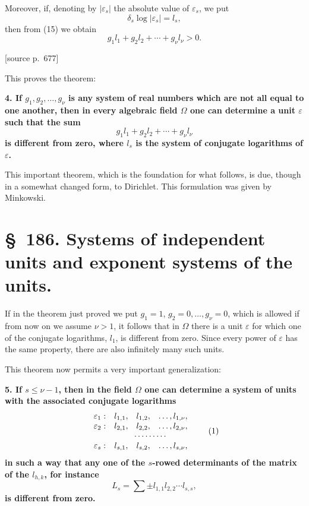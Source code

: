 \documentclass[11pt]{article}
\newcommand{\srcpage}[1]{\par\medskip\noindent\textsf{[source p.~#1]}\par\smallskip}
\begin{document}
Moreover, if, denoting by $|\varepsilon_s|$ the absolute value of $\varepsilon_s$, we put
\begin{equation}
\delta_s\log|\varepsilon_s|=l_s,
\tag{16}
\end{equation}
then from (15) we obtain
\begin{equation}
g_1l_1+g_2l_2+\cdots+g_\nu l_\nu>0.
\tag{17}
\end{equation}

\srcpage{677}
This proves the theorem:

\textbf{4. If $g_1,g_2,\ldots,g_\nu$ is any system of real numbers which are not all equal to one another, then in every algebraic field $\Omega$ one can determine a unit $\varepsilon$ such that the sum}
\[
g_1l_1+g_2l_2+\cdots+g_\nu l_\nu
\]
\textbf{is different from zero, where $l_s$ is the system of conjugate logarithms of $\varepsilon$.}

This important theorem, which is the foundation for what follows, is due, though in a somewhat changed form, to Dirichlet. This formulation was given by Minkowski.

\section*{\S~186. Systems of independent units and exponent systems of the units.}

If in the theorem just proved we put $g_1=1$, $g_2=0,\ldots,g_\nu=0$, which is allowed if from now on we assume $\nu>1$, it follows that in $\Omega$ there is a unit $\varepsilon$ for which one of the conjugate logarithms, $l_1$, is different from zero. Since every power of $\varepsilon$ has the same property, there are also infinitely many such units.

This theorem now permits a very important generalization:

\textbf{5. If $s\leq \nu-1$, then in the field $\Omega$ one can determine a system of units with the associated conjugate logarithms}
\begin{equation}
\begin{array}{cccc}
\varepsilon_1: & l_{1,1},&l_{1,2},&\ldots,l_{1,\nu},\\
\varepsilon_2: & l_{2,1},&l_{2,2},&\ldots,l_{2,\nu},\\
&\multicolumn{3}{c}{\cdots\cdots\cdots}\,\\
\varepsilon_s: & l_{s,1},&l_{s,2},&\ldots,l_{s,\nu},
\end{array}
\tag{1}
\end{equation}
\textbf{in such a way that any one of the $s$-rowed determinants of the matrix of the $l_{h,k}$, for instance}
\[
L_s=\sum \pm l_{1,1}l_{2,2}\cdots l_{s,s},
\]
\textbf{is different from zero.}
\end{document}
